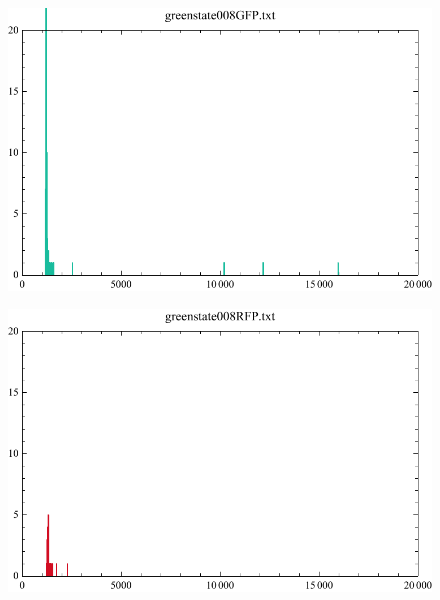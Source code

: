 \documentclass[11pt]{book}
\begin{document}
\pagebreak
\begin{figure}
\centering
	\begin{minipage}{.5\textwidth}
  		\centering
  		\includegraphics[width=.9\linewidth]{greenstate008GFP.pdf}
  		\label{fig:onc1GFPGreenState}
	\end{minipage}%
	\begin{minipage}{.5\textwidth}
  		\centering
  		\includegraphics[width=.9\linewidth]{greenstate008RFP.pdf}
  		\label{fig:onc1RFPGreenState}  
	\end{minipage}
\end{figure}
\end{document}
